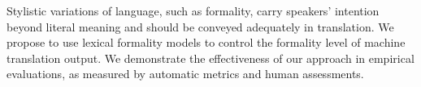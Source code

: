 Stylistic variations of language, such as formality, carry speakers' intention beyond literal meaning and should be conveyed adequately in translation. We propose to use lexical formality models to control the formality level of machine translation output. We demonstrate the effectiveness of our approach in empirical evaluations, as measured by automatic metrics and human assessments.
